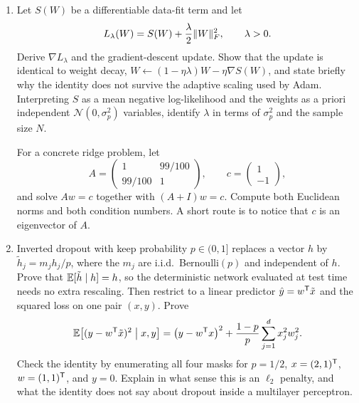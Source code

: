 \begin{enumerate}[label=\textbf{(\alph*)}]
  Finally, prove the dying-ReLU lemma. If a hidden unit has preactivation \(w^\T a(x_n)+b < 0\) at every training point, then under gradient descent with no momentum that unit's parameters never move, and the unit remains inactive on the whole training set.

  \item Let \(S(W)\) be a differentiable data-fit term and let
  \[
    L_\lambda(W) = S(W) + \frac{\lambda}{2}\lVert W\rVert_F^2, \qquad \lambda>0.
  \]
  Derive \(\nabla L_\lambda\) and the gradient-descent update. Show that the update is identical to weight decay, \(W\leftarrow (1-\eta\lambda)W - \eta\nabla S(W)\), and state briefly why the identity does not survive the adaptive scaling used by Adam. Interpreting \(S\) as a mean negative log-likelihood and the weights as a priori independent \(\mathcal N(0,\sigma_p^2)\) variables, identify \(\lambda\) in terms of \(\sigma_p^2\) and the sample size \(N\).

  For a concrete ridge problem, let
  \[
    A
    =
    \begin{pmatrix} 1 & 99/100 \\ 99/100 & 1 \end{pmatrix},
    \qquad
    c = \begin{pmatrix} 1 \\ -1 \end{pmatrix},
  \]
  and solve \(Aw=c\) together with \((A+I)w=c\). Compute both Euclidean norms and both condition numbers. A short route is to notice that \(c\) is an eigenvector of \(A\).

  \item Inverted dropout with keep probability \(p\in(0,1]\) replaces a vector \(h\) by \(\tilde h_j = m_j h_j/p\), where the \(m_j\) are i.i.d.\ Bernoulli\((p)\) and independent of \(h\). Prove that \(\mathbb{E}[\tilde h\mid h] = h\), so the deterministic network evaluated at test time needs no extra rescaling. Then restrict to a linear predictor \(\hat y = w^{\mathsf{T}}\tilde x\) and the squared loss on one pair \((x,y)\). Prove
  \begin{equation}
    \mathbb{E}\bigl[(y-w^{\mathsf{T}}\tilde x)^2 \bigm| x,y\bigr]
    =
    \bigl(y-w^{\mathsf{T}} x\bigr)^2
    + \frac{1-p}{p}\sum_{j=1}^{d} x_j^2 w_j^2.
    \label{eq:dropout-identity}
  \end{equation}
  Check the identity by enumerating all four masks for \(p=1/2\), \(x=(2,1)^{\mathsf{T}}\), \(w=(1,1)^{\mathsf{T}}\), and \(y=0\). Explain in what sense this is an \(\ell_2\) penalty, and what the identity does not say about dropout inside a multilayer perceptron.
\end{enumerate}

